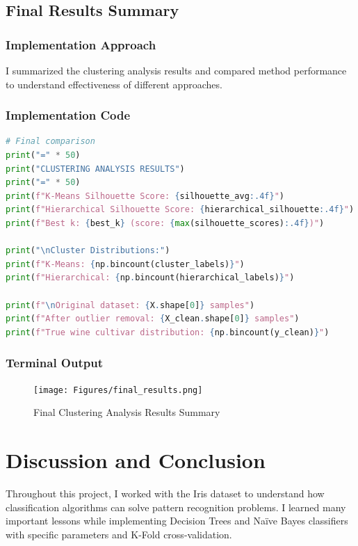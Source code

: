 \documentclass[12pt,a4paper]{article}
\begin{document}
\subsection{Final Results Summary}

\subsubsection{Implementation Approach}
I summarized the clustering analysis results and compared method performance to understand effectiveness of different approaches.

\subsubsection{Implementation Code}
\begin{lstlisting}[language=Python, caption=Final Results Summary and Analysis]
# Final comparison
print("=" * 50)
print("CLUSTERING ANALYSIS RESULTS")
print("=" * 50)
print(f"K-Means Silhouette Score: {silhouette_avg:.4f}")
print(f"Hierarchical Silhouette Score: {hierarchical_silhouette:.4f}")
print(f"Best k: {best_k} (score: {max(silhouette_scores):.4f})")

print("\nCluster Distributions:")
print(f"K-Means: {np.bincount(cluster_labels)}")
print(f"Hierarchical: {np.bincount(hierarchical_labels)}")

print(f"\nOriginal dataset: {X.shape[0]} samples")
print(f"After outlier removal: {X_clean.shape[0]} samples")
print(f"True wine cultivar distribution: {np.bincount(y_clean)}")
\end{lstlisting}

\subsubsection{Terminal Output}
\begin{figure}[h!]
\centering
    \texttt{[image: Figures/final\_results.png]}
    \caption{Final Clustering Analysis Results Summary}
\end{figure}

\section{Discussion and Conclusion}

Throughout this project, I worked with the Iris dataset to understand how classification algorithms can solve pattern recognition problems. I learned many important lessons while implementing Decision Trees and Na\"{i}ve Bayes classifiers with specific parameters and K-Fold cross-validation.
\end{document}
